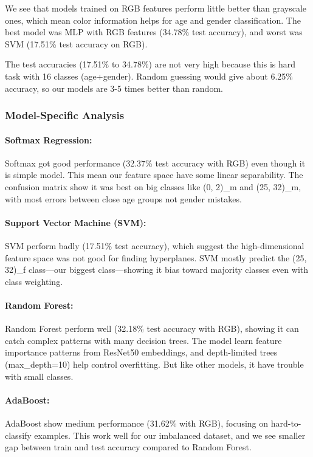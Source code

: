 \documentclass{article}
\begin{document}
We see that models trained on RGB features perform little better than grayscale ones, which mean color information helps for age and gender classification. The best model was MLP with RGB features (34.78\% test accuracy), and worst was SVM (17.51\% test accuracy on RGB).

The test accuracies (17.51\% to 34.78\%) are not very high because this is hard task with 16 classes (age+gender). Random guessing would give about 6.25\% accuracy, so our models are 3-5 times better than random.

\subsubsection{Model-Specific Analysis}

\paragraph{Softmax Regression:} 
Softmax got good performance (32.37\% test accuracy with RGB) even though it is simple model. This mean our feature space have some linear separability. The confusion matrix show it was best on big classes like (0, 2)\_m and (25, 32)\_m, with most errors between close age groups not gender mistakes.

\paragraph{Support Vector Machine (SVM):}
SVM perform badly (17.51\% test accuracy), which suggest the high-dimensional feature space was not good for finding hyperplanes. SVM mostly predict the (25, 32)\_f class—our biggest class—showing it bias toward majority classes even with class weighting.

\paragraph{Random Forest:}
Random Forest perform well (32.18\% test accuracy with RGB), showing it can catch complex patterns with many decision trees. The model learn feature importance patterns from ResNet50 embeddings, and depth-limited trees (max\_depth=10) help control overfitting. But like other models, it have trouble with small classes.

\paragraph{AdaBoost:}
AdaBoost show medium performance (31.62\% with RGB), focusing on hard-to-classify examples. This work well for our imbalanced dataset, and we see smaller gap between train and test accuracy compared to Random Forest.
\end{document}
